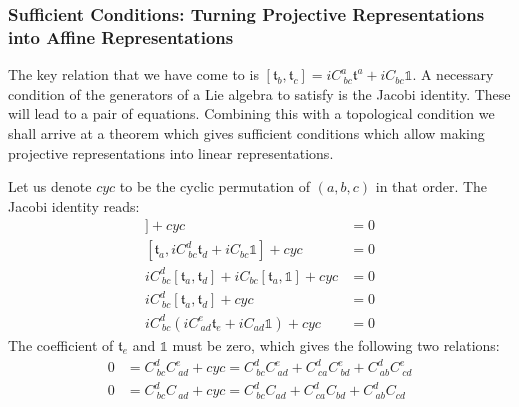 \documentclass[10pt]{article}
\newcommand{\iden}{\mathds{1}}
\newcommand{\mf}{\mathfrak}
\theoremstyle{plain}
\theoremstyle{definition}
\theoremstyle{remark}
\begin{document}
\subsubsection{Sufficient Conditions: Turning 
Projective Representations into Affine Representations}

The key relation that we have come to is $[\mf t_b,\mf t_c] =
iC^{a}_{\ bc}\mf t^a + iC_{bc}\iden$. A necessary condition of the
generators of a Lie algebra to satisfy is the Jacobi identity. These
will lead to a pair of equations. Combining this with a topological
condition we shall arrive at a theorem which gives sufficient
conditions which allow making projective representations into linear
representations.

\newcommand{\mt}{\mf t}
Let us denote $cyc$ to be the cyclic permutation of $(a,b,c)$ in that order.
The Jacobi identity reads:
\begin{align*}
[\mt_a,[\mt_b,\mt_c]]+ cyc &= 0\\
[\mt_a,iC^d_{\ bc}\mt_d + i C_{bc}\iden]+ cyc &= 0\\
    iC^d_{\ bc}[\mt_a,\mt_d]+ i C_{bc}[\mt_a,\iden]+ cyc &= 0\\
iC^d_{\ bc}[\mt_a,\mt_d] + cyc &=0\\
    iC^d_{\ bc}(iC^e_{\ ad}\mt_e+ i C_{ad}\iden)+ cyc &=0
\end{align*}
The coefficient of $\mf t_e$ and $\iden$ must be zero, which gives the
following two relations:
\begin{align*}
    0 &= C^d_{\ bc}C^e_{\ ad} + cyc = 
    C^d_{\ bc}C^e_{\ ad} + C^d_{\ ca}C^e_{\ bd} + C^d_{\ ab}C^e_{\ cd}\\
    0 &= C^d_{\ bc}C_{\ ad} + cyc = 
    C^d_{\ bc}C_{ad} + C^d_{\ ca}C_{bd} + C^d_{\ ab}C_{cd}
\end{align*}
\end{document}
